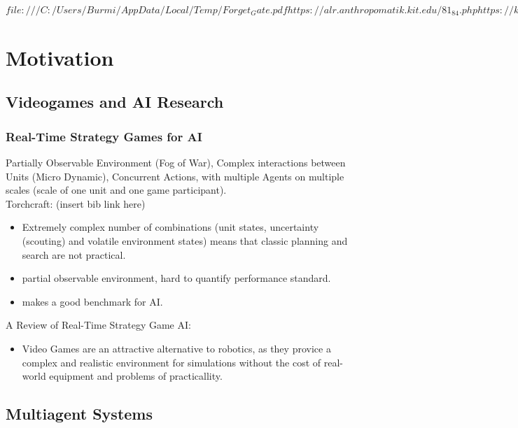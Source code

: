 
$
file:///C:/Users/Burmi/AppData/Local/Temp/Forget_Gate.pdf
https://alr.anthropomatik.kit.edu/81_84.php
https://karrierebibel.de/curriculum-vitae/
https://www.indeed.com/career-advice/resumes-cover-letters/cv-format-guide
$


\chapter{Motivation}
\label{ch:Motivation}

\section{Videogames and AI Research}

\subsection{Real-Time Strategy Games for AI}
\label{ch:Motivation:RTS4AI}
Partially Observable Environment (Fog of War), Complex interactions between Units (Micro Dynamic), Concurrent Actions, with multiple Agents on multiple scales (scale of one unit and one game participant).
\\
Torchcraft: (insert bib link here)
\begin{itemize}[noitemsep,nolistsep]
	\item Extremely complex number of combinations (unit states, uncertainty (scouting) and volatile environment states) means that classic planning and search are not practical. 
	\item partial observable environment, hard to quantify performance standard.
	\item makes a good benchmark for AI.
\end{itemize}
A Review of Real-Time Strategy Game AI:
\begin{itemize}[noitemsep,nolistsep]
	\item Video Games are an attractive alternative to robotics, as they provice a complex and realistic environment for simulations without the cost of real-world equipment and problems of practicallity.
\end{itemize}

\section{Multiagent Systems}

